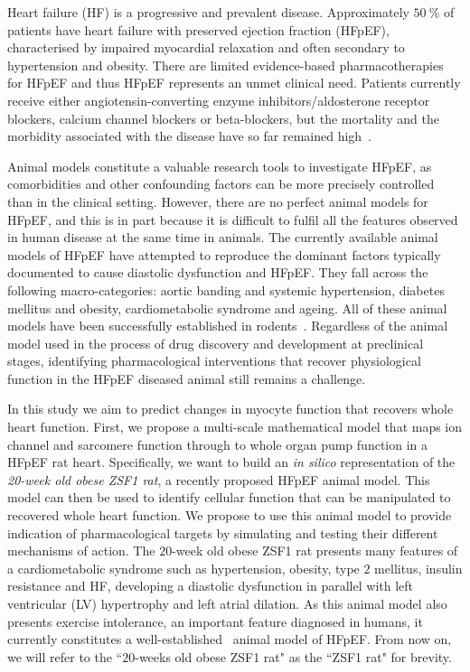 \vspace{0.2cm}\noindent
{}

\noindent
Heart failure (HF) is a progressive and prevalent disease. Approximately $\SI{50}{\percent}$ of patients have heart failure with preserved ejection fraction (HFpEF), characterised by impaired myocardial relaxation and often secondary to hypertension and obesity. There are limited evidence-based pharmacotherapies for HFpEF and thus HFpEF represents an unmet clinical need. Patients currently receive either angiotensin-converting enzyme inhibitors/aldosterone receptor blockers, calcium channel blockers or beta-blockers, but the mortality and the morbidity associated with the disease have so far remained high~\cite{Adamczak:2020}.

\vspace{0.2cm}
Animal models constitute a valuable research tools to investigate HFpEF, as comorbidities and other confounding factors can be more precisely controlled than in the clinical setting. However, there are no perfect animal models for HFpEF, and this is in part because it is difficult to fulfil all the features observed in human disease at the same time in animals. The currently available animal models of HFpEF have attempted to reproduce the dominant factors typically documented to cause diastolic dysfunction and HFpEF. They fall across the following macro-categories: aortic banding and systemic hypertension, diabetes mellitus and obesity, cardiometabolic syndrome and ageing. All of these animal models have been successfully established in rodents~\cite{Conceicao:2016}. Regardless of the animal model used in the process of drug discovery and development at preclinical stages, identifying pharmacological interventions that recover physiological function in the HFpEF diseased animal still remains a challenge.

\vspace{0.2cm}
In this study we aim to predict changes in myocyte function that recovers whole heart function. First, we propose a multi-scale mathematical model that maps ion channel and sarcomere function through to whole organ pump function in a HFpEF rat heart. Specifically, we want to build an \textit{in silico} representation of the \textit{20-week old obese ZSF1 rat}, a recently proposed HFpEF animal model. This model can then be used to identify cellular function that can be manipulated to recovered whole heart function. We propose to use this animal model to provide indication of pharmacological targets by simulating and testing their different mechanisms of action. The $20$-week old obese ZSF1 rat presents many features of a cardiometabolic syndrome such as hypertension, obesity, type $2$ mellitus, insulin resistance and HF, developing a diastolic dysfunction in parallel with left ventricular (LV) hypertrophy and left atrial dilation. As this animal model also presents exercise intolerance, an important feature diagnosed in humans, it currently constitutes a well-established~\cite{Conceicao:2016} animal model of HFpEF. From now on, we will refer to the ``$20$-weeks old obese ZSF1 rat" as the ``ZSF1 rat" for brevity.


